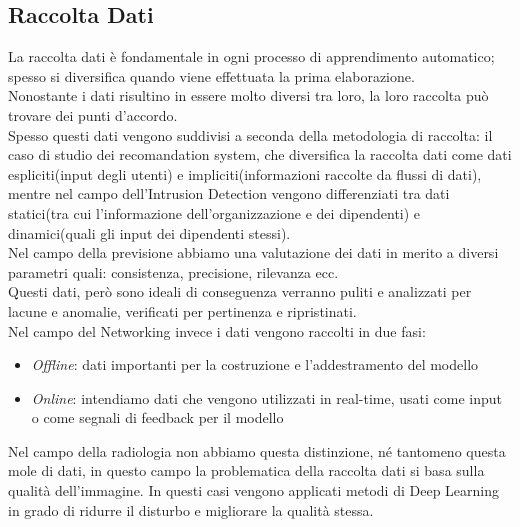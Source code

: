\documentclass[../tesi.tex]{subfiles}
\begin{document}
\subsection{Raccolta Dati}
La raccolta dati è fondamentale in ogni processo di apprendimento automatico; spesso si diversifica quando viene effettuata la prima elaborazione.\\
Nonostante i dati risultino in essere molto diversi tra loro, la loro raccolta può trovare dei punti d’accordo.\\
Spesso questi dati vengono suddivisi a seconda della metodologia di raccolta: il caso di studio dei recomandation system, che diversifica la raccolta dati come dati espliciti(input degli utenti) e impliciti(informazioni raccolte da flussi di dati), mentre nel campo dell’Intrusion Detection vengono differenziati tra dati statici(tra cui l’informazione dell’organizzazione e dei dipendenti) e dinamici(quali gli input dei dipendenti stessi).\\
Nel campo della previsione abbiamo una valutazione dei dati in merito a diversi parametri quali: consistenza, precisione, rilevanza ecc. \\
Questi dati, però sono ideali di conseguenza verranno puliti e analizzati per lacune e anomalie, verificati per pertinenza e ripristinati.\\
Nel campo del Networking invece i dati vengono raccolti in due fasi:
\begin{itemize}
  \item \textit{Offline}: dati importanti per la costruzione e l’addestramento del modello 
  \item \textit{Online}: intendiamo dati che vengono utilizzati in real-time, usati come input o come segnali di feedback per il modello
\end{itemize}
Nel campo della radiologia non abbiamo questa distinzione, né tantomeno questa mole di dati, in questo campo la problematica della raccolta dati si basa sulla qualità dell’immagine. In questi casi vengono applicati metodi di \Gls{Deep Learning} in grado di ridurre il disturbo e migliorare la qualità stessa.
\newpage
\end{document}
